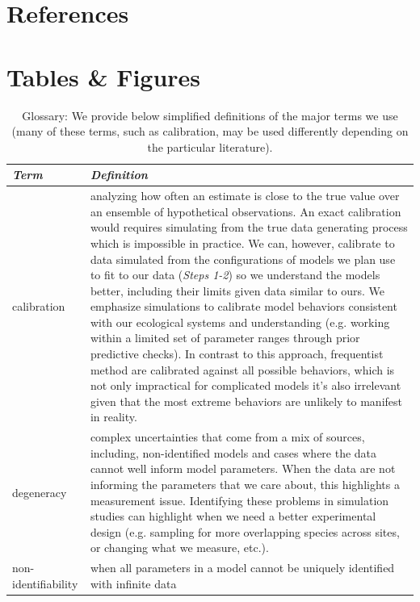 \documentclass[11pt]{article}
\begin{document}
\newpage
\section*{References}
\vspace{-5ex}


\clearpage

\section*{Tables \& Figures}

\begin{table}
\caption{Glossary: We provide below simplified definitions of the major terms we use (many of these terms, such as calibration, may be used differently depending on the particular literature). }
\begin{tabular}{ p{3 cm}  p{13 cm} }  \hline \hline
 \emph{Term}   & \emph{Definition}\\ 
\hline \hline
calibration & analyzing how often an estimate is close to the true value over an ensemble of hypothetical observations.  An exact calibration would requires simulating from the true data generating process which is impossible in practice.  We can, however, calibrate to data simulated from the configurations of models we plan use to fit to our data (\emph{Steps 1-2}) so we understand the models better, including their limits given data similar to ours. We emphasize simulations to calibrate model behaviors consistent with our ecological systems and understanding (e.g. working within a limited set of parameter ranges through prior predictive checks). In contrast to this approach, frequentist method are calibrated against all possible behaviors, which is not only impractical for complicated models it’s also irrelevant given that the most extreme behaviors are unlikely to manifest in reality. \\\hline
degeneracy & complex uncertainties that come from a mix of sources, including, non-identified models and cases where the data cannot well inform model parameters. When the data are not informing the parameters that we care about, this highlights a measurement issue. Identifying these problems in simulation studies can highlight when we need a better experimental design (e.g. sampling for more overlapping species across sites, or changing what we measure, etc.).  \\\hline
non-identifiability & when all parameters in a model cannot be uniquely identified with infinite data \\\hline

\end{tabular}
\end{table}
\end{document}
